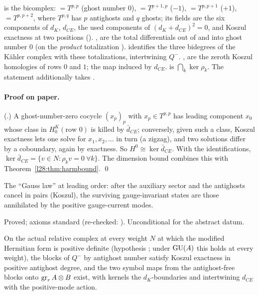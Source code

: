 \begin{dictionary}
 is the bicomplex: $=T^{p,p}$ (ghost number $0$), $=T^{p+1,p}$ ($-1$), $=T^{p,p+1}$
($+1$), $=T^{p,p+2}$, where $T^{p,q}$ has $p$ antighosts and $q$ ghosts; its fields are the six components of $d_K$, $d_{CE}$, the used
components of $(d_K+d_{CE})^2=0$, and Koszul exactness at two positions (). ,  are the total
differentials out of and into ghost number $0$ (on the \emph{product} totalization ).  identifies the three
bidegrees of the Kähler complex with these totalizations, intertwining $Q^-$. ,  are the zeroth Koszul homologies of rows
$0$ and $1$;  the map induced by $d_{CE}$.  is $\bigcap_k\ker\rho_k$. The  statement additionally takes
.
\end{dictionary}

\paragraph{Proof on paper.} (.) A ghost-number-zero cocycle $(x_p)_p$ with $x_p\in T^{p,p}$ has leading component
$x_0$ whose class in $H^K_0(\text{row }0)$ is killed by $\bar d_{CE}$; conversely, given such a class, Koszul exactness lets one solve for
$x_1,x_2,\dots$ in turn (a zigzag), and two solutions differ by a coboundary, again by exactness. So $H^0\cong\ker\bar d_{CE}$. With the
identifications, $\ker\bar d_{CE}=\{v\in N:\rho_kv=0\ \forall k\}$. The dimension bound combines this with Theorem~\ref{l28:thm:harmbound}. \qed

\begin{physics}
The ``Gauss law'' at leading order: after the auxiliary sector and the antighosts cancel in pairs (Koszul), the surviving gauge-invariant states
are those annihilated by the positive gauge-current modes.
\end{physics}

\begin{status}
Proved; axioms standard (re-checked: ). Unconditional for the abstract datum.
\end{status}

\begin{theorem}\label{l28:thm:kexact}
On the actual relative complex at every weight $N$ at which the modified Hermitian form is positive definite (hypothesis ; under
$\mathrm{GU}(A)$ this holds at every weight), the blocks of $Q^-$ by antighost number satisfy Koszul exactness
in positive antighost degree, and the two symbol maps from the antighost-free blocks onto $\operatorname{gr}_rA\otimes B$ exist, with kernels the
$d_K$-boundaries and intertwining $d_{CE}$ with the positive-mode action.
\end{theorem}

